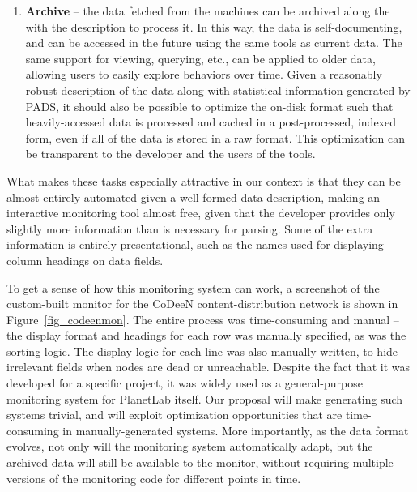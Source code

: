 \begin{enumerate}
\item {\bf Archive} -- the data fetched from the machines can be archived
along the with the description to process it. In this way, the data is
self-documenting, and can be accessed in the future using the same
tools as current data. The same support for viewing, querying, etc.,
can be applied to older data, allowing users to easily explore
behaviors over time. Given a reasonably robust description of the data
along with statistical information generated by PADS, it should also
be possible to optimize the on-disk format such that heavily-accessed
data is processed and cached in a post-processed, indexed form, even
if all of the data is stored in a raw format. This optimization can be
transparent to the developer and the users of the tools.

\end{enumerate}

What makes these tasks especially attractive in our context is that
they can be almost entirely automated given a well-formed data
description, making an interactive monitoring tool almost free, given
that the developer provides only slightly more information than is
necessary for parsing. Some of the extra information is entirely
presentational, such as the names used for displaying column headings
on data fields.

To get a sense of how this monitoring system can work, a screenshot of
the custom-built monitor for the CoDeeN content-distribution network
is shown in Figure~\ref{fig_codeenmon}. The entire process was
time-consuming and manual -- the display format and headings for each
row was manually specified, as was the sorting logic. The display
logic for each line was also manually written, to hide irrelevant
fields when nodes are dead or unreachable. Despite the fact that it
was developed for a specific project, it was widely used as a
general-purpose monitoring system for PlanetLab itself. Our proposal
will make generating such systems trivial, and will exploit
optimization opportunities that are time-consuming in
manually-generated systems. More importantly, as the data format
evolves, not only will the monitoring system automatically adapt, but
the archived data will still be available to the monitor, without
requiring multiple versions of the monitoring code for different points
in time.
